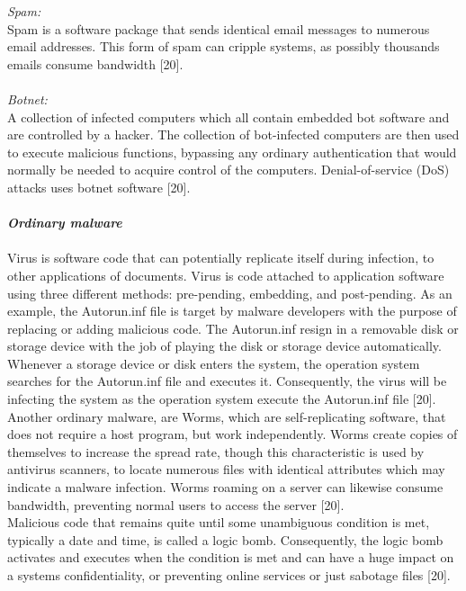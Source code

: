 \documentclass[12pt]{article} %
\begin{document}
\emph{Spam:} \\
Spam is a software package that sends identical email messages to numerous email addresses. This form of spam can cripple systems, as possibly thousands emails consume bandwidth [20].  \\ \\

\emph{Botnet:} \\
A collection of infected computers which all contain embedded bot software and are controlled by a hacker. The collection of bot-infected computers are then used to execute malicious functions, bypassing any ordinary authentication that would normally be needed to acquire control of the computers. Denial-of-service (DoS) attacks uses botnet software [20].  
\\ \\
\textbf{\emph{Ordinary malware}}
\\ \\
Virus is software code that can potentially replicate itself during infection, to other applications of documents. Virus is code attached to application software using three different methods: pre-pending, embedding, and post-pending. As an example, the Autorun.inf file is target by malware developers with the purpose of replacing or adding malicious code. The Autorun.inf resign in a removable disk or storage device with the job of playing the disk or storage device automatically. Whenever a storage device or disk enters the system, the operation system searches for the Autorun.inf file and executes it. Consequently, the virus will be infecting the system as the operation system execute the Autorun.inf file [20].  Another ordinary malware, are Worms, which are self-replicating software, that does not require a host program, but work independently. Worms create copies of themselves to increase the spread rate, though this characteristic is used by antivirus scanners, to locate numerous files with identical attributes which may indicate a malware infection. Worms roaming on a server can likewise consume bandwidth, preventing normal users to access the  server [20]. \\
Malicious code that remains quite until some unambiguous condition is met, typically a date and time, is called a logic bomb. Consequently, the logic bomb activates and executes when the condition is met and can have a huge impact on a systems confidentiality, or preventing online services or just sabotage files [20].  
\\
\end{document}
